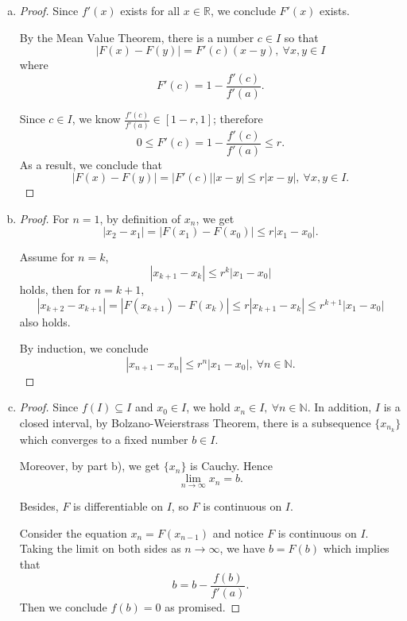 \begin{Exercise}
\begin{enumerate}[a)]
\item 
\begin{proof}
Since $f'(x)$ exists for all $x \in \mathbb{R}$, we conclude $F'(x)$ exists.

By the Mean Value Theorem, there is a number $c \in I$ so that
$$ 
|F(x)-F(y)| = F'(c)(x-y),\ \forall x,y \in I
$$
where 
$$
F'(c) = 1-\frac{f'(c)}{f'(a)}.
$$

Since $c \in I$, we know $\frac{f'(c)}{f'(a)} \in [1-r,1]$; therefore 
$$ 
0 
\leq F'(c) 
= 1-\frac{f'(c)}{f'(a)} 
\leq r.
$$
As a result, we conclude that 
$$
|F(x)-F(y)| = |F'(c)||x-y| \leq r|x-y|,\ \forall x,y \in I. 
$$
\end{proof}

\item
\begin{proof}
For $n=1$, by definition of $x_n$, we get
$$
|x_2-x_1| = |F(x_1)-F(x_0)| \leq r|x_1-x_0|.
$$

Assume for $n=k$, 
$$
|x_{k+1}-x_{k}| \leq r^k|x_1-x_0|
$$ 
holds, then for $n=k+1$, 
$$
|x_{k+2}-x_{k+1}| 
= |F(x_{k+1})-F(x_{k})| 
\leq r|x_{k+1}-x_{k}| 
\leq r^{k+1}|x_1-x_0|
$$ 
also holds.

By induction, we conclude
$$
|x_{n+1}-x_{n}| \leq r^n|x_1-x_0|,\ \forall n \in \mathbb{N}.
$$
\end{proof}

\item 
\begin{proof}
Since $f(I) \subseteq I$ and $x_0 \in I$, we hold $x_n \in I,\ \forall n \in \mathbb{N}$. In addition, $I$ is a closed interval, by Bolzano-Weierstrass Theorem, there is a subsequence $\{x_{n_k}\}$ which converges to a fixed number $b \in I$.

Moreover, by part b), we get $ \{x_n\}$  is Cauchy. Hence $$\lim_{n\to\infty} x_n = b. $$

Besides, $F$ is differentiable on $I$, so $F$ is continuous on $I$.

Consider the equation $x_n = F(x_{n-1})$ and notice $F$ is continuous on $I$. Taking the limit on both sides as $n\to\infty$, we have $b=F(b)$ which implies that $$b=b-\frac{f(b)}{f'(a)}.$$
Then we conclude $f(b)=0$ as promised.
\end{proof}
\end{enumerate}
\end{Exercise}